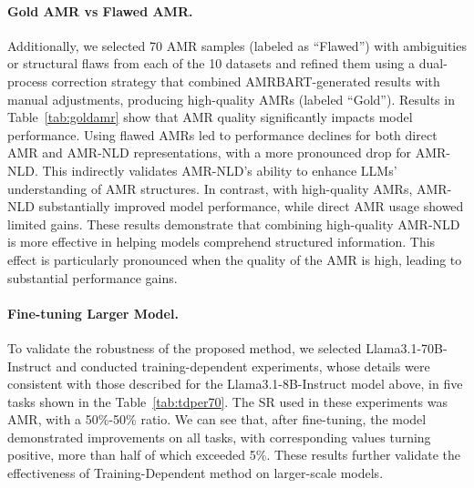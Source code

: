 \paragraph{Gold AMR vs Flawed AMR.}
Additionally, we selected 70 AMR samples (labeled as ``Flawed'') with ambiguities or structural flaws from each of the 10 datasets and refined them using a dual-process correction strategy that combined AMRBART-generated results with manual adjustments, producing high-quality AMRs (labeled ``Gold''). Results in Table~\ref{tab:goldamr} show that AMR quality significantly impacts model performance. Using flawed AMRs led to performance declines for both direct AMR and AMR-NLD representations, with a more pronounced drop for AMR-NLD. This indirectly validates AMR-NLD’s ability to enhance LLMs’ understanding of AMR structures. In contrast, with high-quality AMRs, AMR-NLD substantially improved model performance, while direct AMR usage showed limited gains. These results demonstrate that combining high-quality AMR-NLD is more effective in helping models comprehend structured information. This effect is particularly pronounced when the quality of the AMR is high, leading to substantial performance gains.

\paragraph{Fine-tuning Larger Model.}
To validate the robustness of the proposed method, we selected Llama3.1-70B-Instruct and conducted training-dependent experiments, whose details were consistent with those described for the Llama3.1-8B-Instruct model above, in five tasks shown in the Table~\ref{tab:tdper70}. The SR used in these experiments was AMR, with a 50\%-50\% ratio. We can see that, after fine-tuning, the model demonstrated improvements on all tasks, with corresponding values turning positive, more than half of which exceeded 5\%. These results further validate the effectiveness of Training-Dependent method on larger-scale models.

